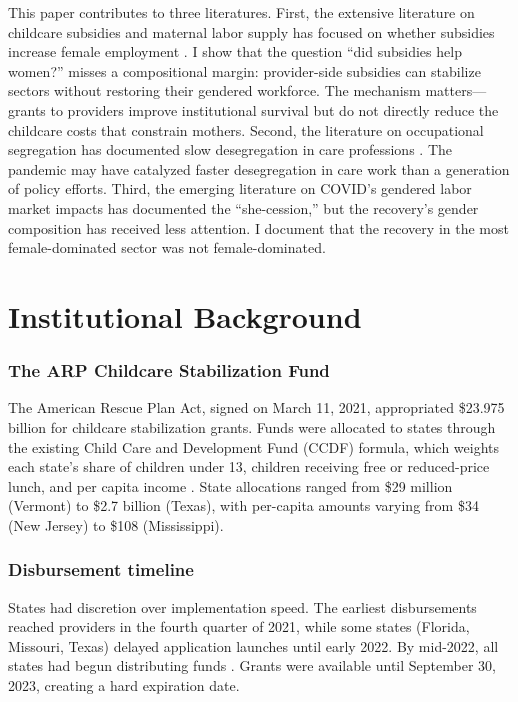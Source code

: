 \documentclass[12pt]{article}
\begin{document}
This paper contributes to three literatures. First, the extensive literature on childcare subsidies and maternal labor supply has focused on whether subsidies increase female employment \citep{herbst2017universal, baker2008universal, cascio2009kindergarten, havnes2011money}. I show that the question ``did subsidies help women?'' misses a compositional margin: provider-side subsidies can stabilize sectors without restoring their gendered workforce. The mechanism matters---grants to providers improve institutional survival but do not directly reduce the childcare costs that constrain mothers. Second, the literature on occupational segregation has documented slow desegregation in care professions \citep{cortes2018occupation, england2002wages, budig2002care}. The pandemic may have catalyzed faster desegregation in care work than a generation of policy efforts. Third, the emerging literature on COVID's gendered labor market impacts \citep{albanesi2021gendered, alon2020impact, heggeness2021estimating} has documented the ``she-cession,'' but the recovery's gender composition has received less attention. I document that the recovery in the most female-dominated sector was not female-dominated.

\section{Institutional Background}

\subsubsection*{The ARP Childcare Stabilization Fund} The American Rescue Plan Act, signed on March 11, 2021, appropriated \$23.975 billion for childcare stabilization grants. Funds were allocated to states through the existing Child Care and Development Fund (CCDF) formula, which weights each state's share of children under 13, children receiving free or reduced-price lunch, and per capita income \citep{ccdf2021formula}. State allocations ranged from \$29 million (Vermont) to \$2.7 billion (Texas), with per-capita amounts varying from \$34 (New Jersey) to \$108 (Mississippi).

\subsubsection*{Disbursement timeline} States had discretion over implementation speed. The earliest disbursements reached providers in the fourth quarter of 2021, while some states (Florida, Missouri, Texas) delayed application launches until early 2022. By mid-2022, all states had begun distributing funds \citep{ccaware2022tracker}. Grants were available until September 30, 2023, creating a hard expiration date.
\end{document}

